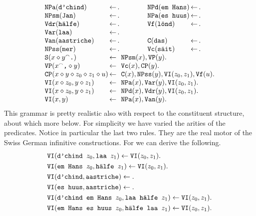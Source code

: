 \begin{equation}
$$\begin{array}{l@{\, \hrn \,}l@{\qquad\qquad}l@{\,\hrn\,}l}
\mbox{\tt NPa}(\mbox{\tt d'chind}) & . &
\mbox{\tt NPd}(\mbox{\tt em Hans}) & . \\
\mbox{\tt NPsm}(\mbox{\tt Jan}) & . &
\mbox{\tt NPa}(\mbox{\tt es huus}) & . \\
\mbox{\tt Vdr}(\mbox{\tt h\"alfe}) & . &
\mbox{\tt Vf}(\mbox{\tt l\"ond}) & . \\
\mbox{\tt Var}(\mbox{\tt laa}) & . \\
\mbox{\tt Van}(\mbox{\tt aastriche}) & . &
\mbox{\tt C}(\mbox{\tt das}) & . \\
\mbox{\tt NPss}(\mbox{\tt mer}) & . &
\mbox{\tt Vc}(\mbox{\tt s\"ait}) & . \\
\mbox{\tt S}(x\oconc y\conc\mbox{\tt .}) & 
	\multicolumn{3}{l}{\mbox{\tt NPsm}(x), \mbox{\tt VP}(y).} \\
\mbox{\tt VP}(x\conc\mbox{\tt ,}\oconc y) & 
	\multicolumn{3}{l}{\mbox{\tt Vc}(x), \mbox{\tt CP}(y).} \\
\mbox{\tt CP}(x\oconc y\oconc z_0\oconc z_1\oconc u) & 
	\multicolumn{3}{l}{\mbox{\tt C}(x), \mbox{\tt NPss}(y),
    \mbox{\tt VI}(z_0, z_1), \mbox{\tt Vf}(u).} \\
\mbox{\tt VI}(x\oconc z_0,y\oconc z_1) & 
	\multicolumn{3}{l}{\mbox{\tt NPa}(x), \mbox{\tt Var}(y), 
	\mbox{\tt VI}(z_0, z_1).} \\
\mbox{\tt VI}(x\oconc z_0,y\oconc z_1) & \multicolumn{3}{l}{\mbox{\tt NPd}(x),
    \mbox{\tt Vdr}(y), \mbox{\tt VI}(z_0, z_1).} \\
\mbox{\tt VI}(x,y) & \multicolumn{3}{l}{\mbox{\tt NPa}(x), \mbox{\tt Van}(y).}
\end{array}$$
\end{equation}
This grammar is pretty realistic also with respect to the
constituent structure, about which more below. For simplicity
we have varied the arities of the predicates. Notice in
particular the last two rules. They are the real motor of
the Swiss German infinitive constructions. For we can
derive the following.
\begin{align}
& \mbox{\tt VI}(\mbox{\tt d'chind } z_0, \mbox{\tt laa } z_1) \leftarrow
    \mbox{\tt VI}(z_0, z_1). \\
& \mbox{\tt VI}(\mbox{\tt em Hans } z_0, \mbox{\tt h\"alfe } z_1) \leftarrow
    \mbox{\tt VI}(z_0, z_1). \\
& \mbox{\tt VI}(\mbox{\tt d'chind}, \mbox{\tt aastriche}) \leftarrow . \\
& \mbox{\tt VI}(\mbox{\tt es huus}, \mbox{\tt aastriche}) \leftarrow . \\
& \mbox{\tt VI}(\mbox{\tt d'chind em Hans }z_0,
    \mbox{\tt laa h\"alfe }z_1) \leftarrow
    \mbox{\tt VI}(z_0, z_1). \\
& \mbox{\tt VI}(\mbox{\tt em Hans es huus }z_0,
    \mbox{\tt h\"alfe laa }z_1) \leftarrow
    \mbox{\tt VI}(z_0, z_1).
\end{align}
